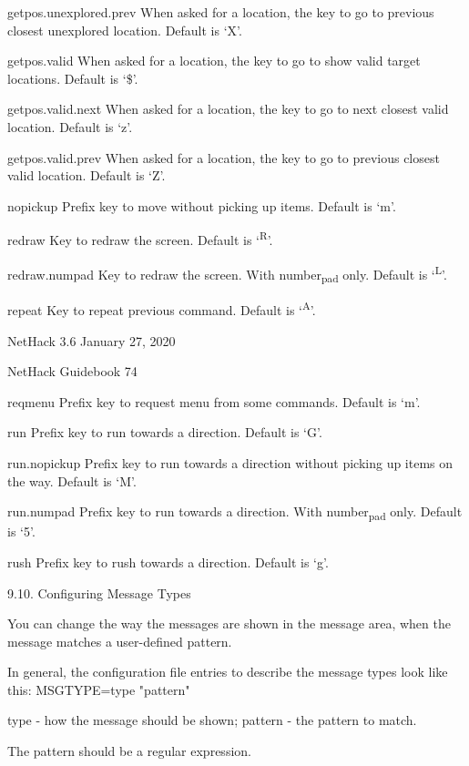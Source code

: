 \documentclass[11pt]{article}
\begin{document}
getpos.unexplored.prev
 When asked for a location, the key to go to previous closest
 unexplored location. Default is `X'.

getpos.valid
 When asked for a location, the key to go to show valid target
 locations. Default is `\$'.

getpos.valid.next
 When asked for a location, the key to go to next closest valid
 location. Default is `z'.

getpos.valid.prev
 When asked for a location, the key to go to previous closest
 valid location. Default is `Z'.

nopickup
 Prefix key to move without picking up items. Default is `m'.

redraw
 Key to redraw the screen. Default is `\textsuperscript{R}'.

redraw.numpad
 Key to redraw the screen. With number\textsubscript{pad} only. Default is
 `\textsuperscript{L}'.

repeat
 Key to repeat previous command. Default is `\textsuperscript{A}'.



NetHack 3.6                   January 27, 2020





NetHack Guidebook                       74



reqmenu
 Prefix key to request menu from some commands. Default is `m'.

run
 Prefix key to run towards a direction. Default is `G'.

run.nopickup
 Prefix key to run towards a direction without picking up items
 on the way. Default is `M'.

run.numpad
 Prefix key to run towards a direction. With number\textsubscript{pad} only.
 Default is `5'.

rush
 Prefix key to rush towards a direction. Default is `g'.

9.10. Configuring Message Types

   You can change the way the messages are shown in the message
area, when the message matches a user-defined pattern.

   In general, the configuration file entries to describe the
message types look like this: MSGTYPE=type "pattern"

type  - how the message should be shown;
pattern - the pattern to match.

The pattern should be a regular expression.
\end{document}
